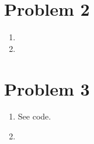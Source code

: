 \documentclass{article}
\begin{document}



\section*{Problem 2}
\begin{enumerate}[label=(\roman*)]
\item
\item

\end{enumerate}



\section*{Problem 3}
\begin{enumerate}[label=(\roman*)]
\item See code.
\item

\end{enumerate}
\end{document}
